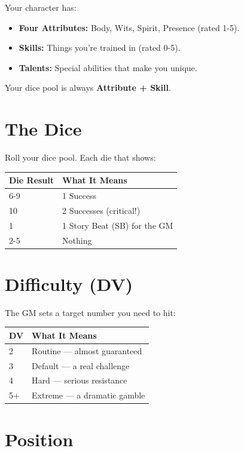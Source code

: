 Your character has:
\begin{itemize}
  \item \textbf{Four Attributes:} Body, Wits, Spirit, Presence (rated 1-5).
  \item \textbf{Skills:} Things you're trained in (rated 0-5).
  \item \textbf{Talents:} Special abilities that make you unique.
\end{itemize}

Your dice pool is always \textbf{Attribute + Skill}.

\section{The Dice}

Roll your dice pool. Each die that shows:

\begin{center}
\begin{tabular}{ll}
\toprule
\textbf{Die Result} & \textbf{What It Means} \\
\midrule
6-9 & 1 Success \\
10 & 2 Successes (critical!) \\
1 & 1 Story Beat (SB) for the GM \\
2-5 & Nothing \\
\bottomrule
\end{tabular}
\end{center}

\section{Difficulty (DV)}

The GM sets a target number you need to hit:

\begin{center}
\begin{tabular}{ll}
\toprule
\textbf{DV} & \textbf{What It Means} \\
\midrule
2 & Routine — almost guaranteed \\
3 & Default — a real challenge \\
4 & Hard — serious resistance \\
5+ & Extreme — a dramatic gamble \\
\bottomrule
\end{tabular}
\end{center}

\section{Position}

